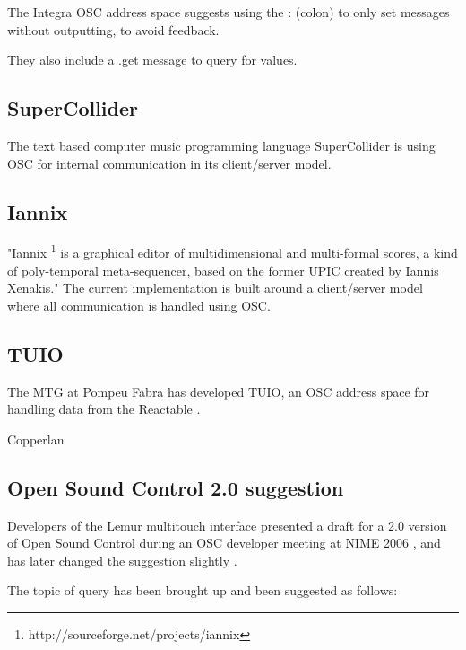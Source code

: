 \documentclass{sig-alternate}
\begin{document}
The Integra OSC address space suggests using the : (colon) to only set messages without outputting, to avoid feedback. 

They also include a .get message to query for values. 


\subsection{SuperCollider}

The text based computer music programming language SuperCollider is using OSC for internal communication in its client/server model. 


\subsection{Iannix}

"Iannix \footnote{http://sourceforge.net/projects/iannix} is a graphical editor of multidimensional and multi-formal scores, a kind of poly-temporal meta-sequencer, based on the former UPIC created by Iannis Xenakis." The current implementation is built around a client/server model where all communication is handled using OSC. 

\cite{Coduys:2004}


\subsection{TUIO}

The MTG at Pompeu Fabra has developed TUIO, an OSC address space for handling data from the Reactable \cite{Kaltenbrunner:2005}.

Copperlan

\subsection{Open Sound Control 2.0 suggestion}

Developers of the Lemur multitouch interface presented a draft for a 2.0 version of Open Sound Control during an OSC developer meeting at NIME 2006 \cite{Jazzmutant:2006}, and has later changed the suggestion slightly \cite{Jazzmutant:2007}. 

The topic of query has been brought up and been suggested as follows: 




\end{document}
